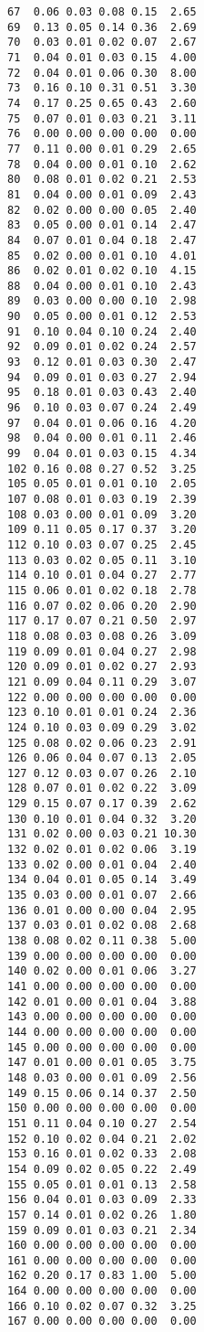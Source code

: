 \documentclass[
]{article}
\begin{document}
\begin{verbatim}
67  0.06 0.03 0.08 0.15  2.65
69  0.13 0.05 0.14 0.36  2.69
70  0.03 0.01 0.02 0.07  2.67
71  0.04 0.01 0.03 0.15  4.00
72  0.04 0.01 0.06 0.30  8.00
73  0.16 0.10 0.31 0.51  3.30
74  0.17 0.25 0.65 0.43  2.60
75  0.07 0.01 0.03 0.21  3.11
76  0.00 0.00 0.00 0.00  0.00
77  0.11 0.00 0.01 0.29  2.65
78  0.04 0.00 0.01 0.10  2.62
80  0.08 0.01 0.02 0.21  2.53
81  0.04 0.00 0.01 0.09  2.43
82  0.02 0.00 0.00 0.05  2.40
83  0.05 0.00 0.01 0.14  2.47
84  0.07 0.01 0.04 0.18  2.47
85  0.02 0.00 0.01 0.10  4.01
86  0.02 0.01 0.02 0.10  4.15
88  0.04 0.00 0.01 0.10  2.43
89  0.03 0.00 0.00 0.10  2.98
90  0.05 0.00 0.01 0.12  2.53
91  0.10 0.04 0.10 0.24  2.40
92  0.09 0.01 0.02 0.24  2.57
93  0.12 0.01 0.03 0.30  2.47
94  0.09 0.01 0.03 0.27  2.94
95  0.18 0.01 0.03 0.43  2.40
96  0.10 0.03 0.07 0.24  2.49
97  0.04 0.01 0.06 0.16  4.20
98  0.04 0.00 0.01 0.11  2.46
99  0.04 0.01 0.03 0.15  4.34
102 0.16 0.08 0.27 0.52  3.25
105 0.05 0.01 0.01 0.10  2.05
107 0.08 0.01 0.03 0.19  2.39
108 0.03 0.00 0.01 0.09  3.20
109 0.11 0.05 0.17 0.37  3.20
112 0.10 0.03 0.07 0.25  2.45
113 0.03 0.02 0.05 0.11  3.10
114 0.10 0.01 0.04 0.27  2.77
115 0.06 0.01 0.02 0.18  2.78
116 0.07 0.02 0.06 0.20  2.90
117 0.17 0.07 0.21 0.50  2.97
118 0.08 0.03 0.08 0.26  3.09
119 0.09 0.01 0.04 0.27  2.98
120 0.09 0.01 0.02 0.27  2.93
121 0.09 0.04 0.11 0.29  3.07
122 0.00 0.00 0.00 0.00  0.00
123 0.10 0.01 0.01 0.24  2.36
124 0.10 0.03 0.09 0.29  3.02
125 0.08 0.02 0.06 0.23  2.91
126 0.06 0.04 0.07 0.13  2.05
127 0.12 0.03 0.07 0.26  2.10
128 0.07 0.01 0.02 0.22  3.09
129 0.15 0.07 0.17 0.39  2.62
130 0.10 0.01 0.04 0.32  3.20
131 0.02 0.00 0.03 0.21 10.30
132 0.02 0.01 0.02 0.06  3.19
133 0.02 0.00 0.01 0.04  2.40
134 0.04 0.01 0.05 0.14  3.49
135 0.03 0.00 0.01 0.07  2.66
136 0.01 0.00 0.00 0.04  2.95
137 0.03 0.01 0.02 0.08  2.68
138 0.08 0.02 0.11 0.38  5.00
139 0.00 0.00 0.00 0.00  0.00
140 0.02 0.00 0.01 0.06  3.27
141 0.00 0.00 0.00 0.00  0.00
142 0.01 0.00 0.01 0.04  3.88
143 0.00 0.00 0.00 0.00  0.00
144 0.00 0.00 0.00 0.00  0.00
145 0.00 0.00 0.00 0.00  0.00
147 0.01 0.00 0.01 0.05  3.75
148 0.03 0.00 0.01 0.09  2.56
149 0.15 0.06 0.14 0.37  2.50
150 0.00 0.00 0.00 0.00  0.00
151 0.11 0.04 0.10 0.27  2.54
152 0.10 0.02 0.04 0.21  2.02
153 0.16 0.01 0.02 0.33  2.08
154 0.09 0.02 0.05 0.22  2.49
155 0.05 0.01 0.01 0.13  2.58
156 0.04 0.01 0.03 0.09  2.33
157 0.14 0.01 0.02 0.26  1.80
159 0.09 0.01 0.03 0.21  2.34
160 0.00 0.00 0.00 0.00  0.00
161 0.00 0.00 0.00 0.00  0.00
162 0.20 0.17 0.83 1.00  5.00
164 0.00 0.00 0.00 0.00  0.00
166 0.10 0.02 0.07 0.32  3.25
167 0.00 0.00 0.00 0.00  0.00

\end{verbatim}
\end{document}
